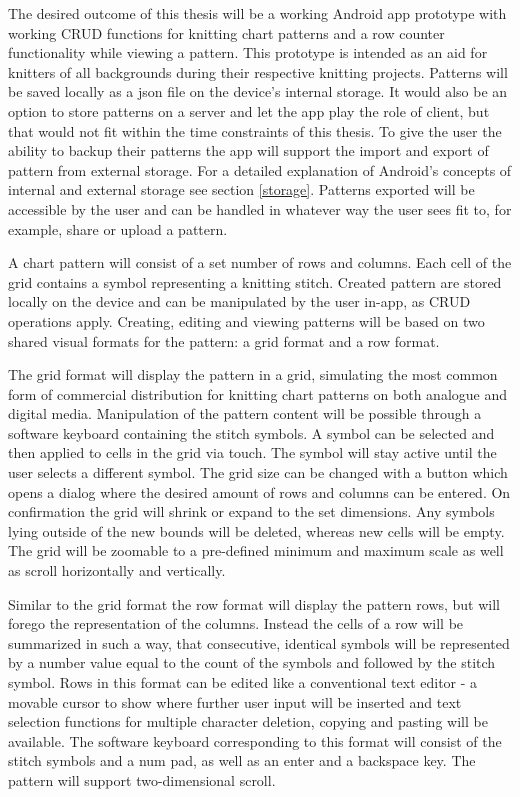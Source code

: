 The desired outcome of this thesis will be a working Android app prototype with working CRUD functions for knitting chart patterns and a row counter functionality while viewing a pattern. This prototype is intended as an aid for knitters of all backgrounds during their respective knitting projects. Patterns will be saved locally as a \gls{json} file on the device's internal storage. It would also be an option to store patterns on a server and let the app play the role of client, but that would not fit within the time constraints of this thesis. To give the user the ability to backup their patterns the app will support the import and export of pattern from external storage. For a detailed explanation of Android's concepts of internal and external storage see section \ref{storage}. Patterns exported will be accessible by the user and can be handled in whatever way the user sees fit to, for example, share or upload a pattern.

A chart pattern will consist of a set number of rows and columns. Each cell of the grid contains a symbol representing a knitting stitch. Created pattern are stored locally on the device and can be manipulated by the user in-app, as CRUD operations apply. Creating, editing and viewing patterns will be based on two shared visual formats for the pattern: a grid format and a row format.

The grid format will display the pattern in a grid, simulating the most common form of commercial distribution for knitting chart patterns on both analogue and digital media. Manipulation of the pattern content will be possible through a software keyboard containing the stitch symbols. A symbol can be selected and then applied to cells in the grid via touch. The symbol will stay active until the user selects a different symbol. The grid size can be changed with a button which opens a dialog where the desired amount of rows and columns can be entered. On confirmation the grid will shrink or expand to the set dimensions. Any symbols lying outside of the new bounds will be deleted, whereas new cells will be empty. The grid will be zoomable to a pre-defined minimum and maximum scale as well as scroll horizontally and vertically.

Similar to the grid format the row format will display the pattern rows, but will forego the representation of the columns. Instead the cells of a row will be summarized in such a way, that consecutive, identical symbols will be represented  by a number value equal to the count of the symbols and followed by the stitch symbol. Rows in this format can be edited like a conventional text editor - a movable cursor to show where further user input will be inserted and text selection functions for multiple character deletion, copying and pasting will be available. The software keyboard corresponding to this format will consist of the stitch symbols and a num pad, as well as an enter and a backspace key. The pattern will support two-dimensional scroll.

